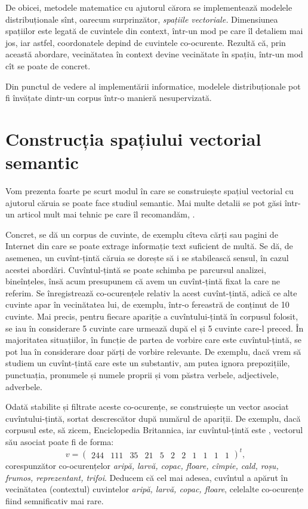 De obicei, metodele matematice cu ajutorul cărora se implementează modelele
dis\-tri\-bu\-ți\-o\-na\-le sînt, oarecum surprinzător, \emph{spațiile vectoriale.}
Dimensiunea spațiilor este legată de cuvintele din context, într-un mod pe
care îl detaliem mai jos, iar astfel, coordonatele depind de cuvintele
co-ocurente. Rezultă că, prin această abordare, vecinătatea în context devine
vecinătate în spațiu, într-un mod cît se poate de concret.

Din punctul de vedere al implementării informatice, modelele distribuționale
pot fi învățate dintr-un corpus într-o manieră nesupervizată.

\section{Construcția spațiului vectorial semantic}

Vom prezenta foarte pe scurt modul în care se construiește spațiul vectorial
cu ajutorul căruia se poate face studiul semantic. Mai multe detalii se pot
găsi într-un articol mult mai tehnic pe care îl recomandăm, \cite{turney}.

Concret, se dă un corpus de cuvinte, de exemplu cîteva cărți sau pagini
de Internet din care se poate extrage informație text suficient de multă.
Se dă, de asemenea, un cuvînt-țintă căruia se dorește să i se stabilească
sensul, în cazul acestei abordări. Cuvîntul-țintă se poate schimba pe parcursul
analizei, bineînțeles, însă acum presupunem că avem un cuvînt-țintă fixat la
care ne referim. Se înregistrează co-ocurențele relativ la acest cuvînt-țintă,
adică ce alte cuvinte apar în vecinătatea lui, de exemplu, într-o fereastră
de conținut de 10 cuvinte. Mai precis, pentru fiecare apariție a
cuvîntului-țintă în corpusul folosit, se iau în considerare 5 cuvinte care
urmează după el și 5 cuvinte care-l preced. În majoritatea situațiilor, în
funcție de partea de vorbire care este cuvîntul-țintă, se pot lua în considerare
doar părți de vorbire relevante. De exemplu, dacă vrem să studiem un
cuvînt-țintă care este un substantiv, am putea ignora prepozițiile, punctuația,
pronumele și numele proprii și vom păstra verbele, adjectivele, adverbele.

Odată stabilite și filtrate aceste co-ocurențe, se construiește un vector
asociat cuvîntului-țintă, sortat descrescător după numărul de apariții.
De exemplu, dacă corpusul este, să zicem, Enciclopedia Britannica, iar
cuvîntul-țintă este , vectorul său asociat poate fi de forma:
\[
  v = \begin{pmatrix}
    244 & 111 & 35 & 21 & 5 & 2 & 2 & 1 & 1 & 1 & 1
  \end{pmatrix}^t,
\]
corespunzător co-ocurențelor \emph{aripă, larvă, copac, floare, cîmpie, %
  cald, roșu, frumos, reprezentant, trifoi}. Deducem că cel mai adesea,
cuvîntul  a apărut în vecinătatea (contextul) cuvintelor
\emph{aripă, larvă, copac, floare}, celelalte co-ocurențe fiind semnificativ
mai rare.

